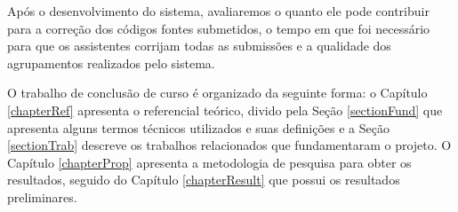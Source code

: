 	Após o desenvolvimento do sistema, avaliaremos o quanto ele pode contribuir para
	a correção dos códigos fontes submetidos, o tempo em que foi necessário para que
	os assistentes corrijam todas as submissões e a qualidade dos agrupamentos
	realizados pelo sistema.
	
	O trabalho de conclusão de curso é organizado da seguinte forma: o Capítulo
	\ref{chapterRef} apresenta o referencial teórico, divido pela Seção \ref{sectionFund}
	que apresenta alguns termos técnicos utilizados e suas definições e a Seção
	\ref{sectionTrab} descreve os trabalhos relacionados que fundamentaram o projeto.
	O Capítulo \ref{chapterProp} apresenta a metodologia de pesquisa para obter os
	resultados, seguido do Capítulo \ref{chapterResult} que possui os resultados
	preliminares.
